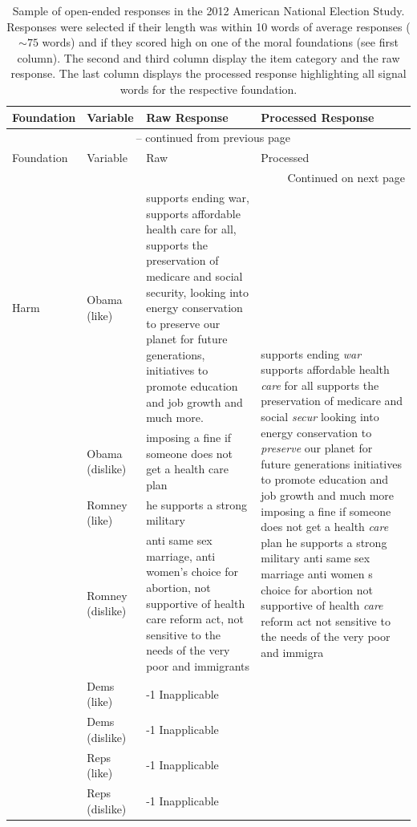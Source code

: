 \documentclass[12pt]{article}
\begin{document}
\begin{center}
\begin{longtable}{lp{1.5cm}p{5.5cm}p{5.5cm}}
\caption[Open-Ended Responses]{Sample of open-ended responses in the 2012 American National Election Study. Responses were selected if their length was within 10 words of average responses ($\sim75$ words) and if they scored high on one of the moral foundations (see first column). The second and third column display the item category and the raw response. The last column displays the processed response highlighting all signal words for the respective foundation.}\label{tab:sample} \\

\hline
	\textbf{Foundation} & \textbf{Variable} & Raw Response & Processed Response \\ \hline \endfirsthead
	
	\multicolumn{4}{c}{{\tablename\ \thetable{} -- continued from previous page}} \\
	\hline Foundation & Variable & Raw & Processed \\ \hline \endhead
	
	\hline \multicolumn{4}{r}{{Continued on next page}} \\	\endfoot
	
	\hline	\endlastfoot
	
	Harm & Obama (like) & supports ending war, supports affordable health care for all, supports the preservation of medicare and social security, looking into energy conservation to preserve our planet for future generations, initiatives to promote education and job growth and much more. & \multirow{8}{5.5cm}{supports ending \textit{war} supports affordable health \textit{care} for all supports the preservation of medicare and social \textit{secur} looking into energy conservation to \textit{preserve} our planet for future generations initiatives to promote education and job growth and much more imposing a fine if someone does not get a health \textit{care} plan he supports a strong military anti same sex marriage anti women s choice for abortion not supportive of health \textit{care} reform act not sensitive to the needs of the very poor and immigra} \\
		 & Obama (dislike) & imposing a fine if someone does not get a health care plan \\
		 & Romney (like) & he supports a strong military \\
		 & Romney (dislike) & anti same sex marriage, anti women's choice for abortion, not supportive of health care reform act, not sensitive to the needs of the very poor and immigrants \\
		 & Dems (like) & -1 Inapplicable \\
		 & Dems (dislike) & -1 Inapplicable \\
		 & Reps (like) & -1 Inapplicable \\
		 & Reps (dislike) & -1 Inapplicable \\ \hline
	

\end{longtable}
\end{center}
\end{document}
